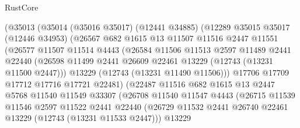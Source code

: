 \begin{lexlean}{RustCore}
\begin{coremodule}
                  (@35013
                    (@35014
                      (@35016 @35017)
                      (@12441 @34885)
                      (@12289
                        @35015
                        @35017
                        (@12446 @34953)
                        (@26567
                          @682
                          @1615
                          @13
                          @11507
                          @11516
                          @2447
                          @11551
                          (@26577
                            @11507
                            @11514
                            @4443
                            (@26584
                              @11506
                              @11513
                              @2597
                              @11489
                              @2441
                              @22440
                              (@26598
                                @11499
                                @2441
                                @26609
                                @22461
                                @13229
                                (@12743 (@13231 @11500 @2447)))
                              @13229
                              (@12743 (@13231 @11490 @11506)))
                            @17706
                            @17709
                            @17712
                            @17716
                            @17721
                            @22481)
                          (@22487
                            @11516
                            @682
                            @1615
                            @13
                            @2447
                            @5768
                            @11540
                            @11549
                            @33307
                            (@26708
                              @11540
                              @11547
                              @4443
                              (@26715
                                @11539
                                @11546
                                @2597
                                @11522
                                @2441
                                @22440
                                (@26729
                                  @11532
                                  @2441
                                  @26740
                                  @22461
                                  @13229
                                  (@12743 (@13231 @11533 @2447)))
                                @13229

\end{coremodule}
\end{lexlean}
